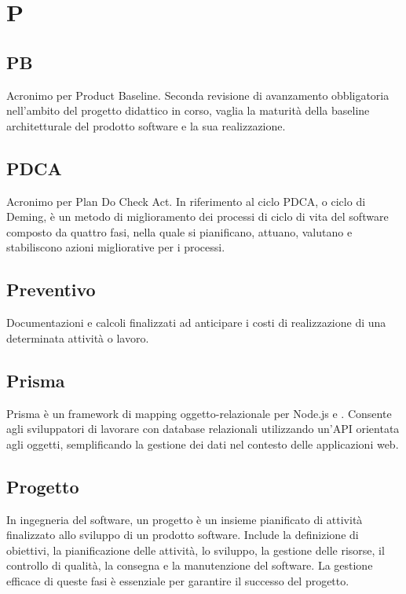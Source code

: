 \chapter{P}

\section{PB}\label{sec:Product Baseline}
Acronimo per Product Baseline. Seconda revisione di avanzamento obbligatoria nell'ambito del progetto didattico in corso, vaglia la maturità della baseline architetturale del prodotto software e la sua realizzazione.

\section{PDCA}\label{sec:Plan Do Check Act}
Acronimo per Plan Do Check Act. In riferimento al ciclo PDCA, o ciclo di Deming, è un metodo di miglioramento dei processi di ciclo di vita del software composto da quattro fasi, nella quale si pianificano, attuano, valutano e stabiliscono azioni migliorative per i processi.

\section{Preventivo}\label{sec:Preventivi}
Documentazioni e calcoli finalizzati ad anticipare i costi di realizzazione di una determinata attività o lavoro.

\section{Prisma}
Prisma  è un framework di mapping oggetto-relazionale per Node.js e . Consente agli sviluppatori di lavorare con database relazionali utilizzando un'API orientata agli oggetti, semplificando la gestione dei dati nel contesto delle applicazioni web.

\section{Progetto}\label{sec:Progetti}
In ingegneria del software, un progetto è un insieme pianificato di attività finalizzato allo sviluppo di un prodotto software. Include la definizione di obiettivi, la pianificazione delle attività, lo sviluppo, la gestione delle risorse, il controllo di qualità, la consegna e la manutenzione del software. La gestione efficace di queste fasi è essenziale per garantire il successo del progetto.

